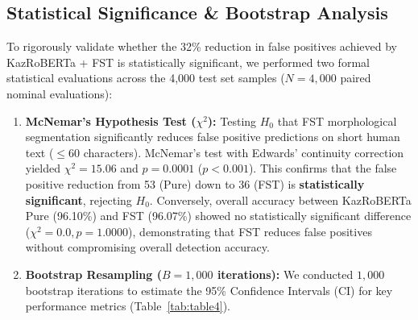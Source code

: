 \documentclass[runningheads]{llncs}
\begin{document}
\subsection{Statistical Significance \& Bootstrap Analysis}
To rigorously validate whether the 32\% reduction in false positives achieved by KazRoBERTa + FST is statistically significant, we performed two formal statistical evaluations across the 4,000 test set samples ($N = 4,000$ paired nominal evaluations):

\begin{enumerate}
\item \textbf{McNemar's Hypothesis Test ($\chi^2$):} Testing $H_0$ that FST morphological segmentation significantly reduces false positive predictions on short human text ($\le 60$ characters). McNemar's test with Edwards' continuity correction yielded $\chi^2 = 15.06$ and $p = 0.0001$ ($p < 0.001$). This confirms that the false positive reduction from 53 (Pure) down to 36 (FST) is \textbf{statistically significant}, rejecting $H_0$. Conversely, overall accuracy between KazRoBERTa Pure (96.10\%) and FST (96.07\%) showed no statistically significant difference ($\chi^2 = 0.0, p = 1.0000$), demonstrating that FST reduces false positives without compromising overall detection accuracy.
\item \textbf{Bootstrap Resampling ($B = 1,000$ iterations):} We conducted $1,000$ bootstrap iterations to estimate the 95\% Confidence Intervals (CI) for key performance metrics (Table~\ref{tab:table4}).
\end{enumerate}

\begin{table}[htbp]
\caption{Statistical Significance \& 95\% Bootstrap Confidence Intervals ($B = 1,000$)}
\label{tab:table4}
\centering
{}
\end{table}
\end{document}

